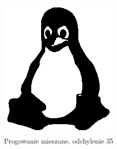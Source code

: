 \documentclass[12pt, a4paper]{article}
\begin{document}
\begin{figure}[p]
\includegraphics{mixed_35}
\caption{Progowanie mieszane, odchylenie 35}
\label{fig:mixed_35}
\end{figure}
\end{document}
